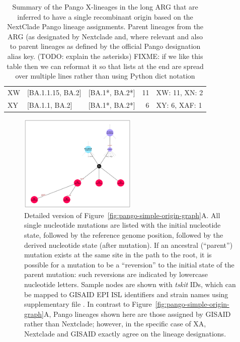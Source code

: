 \documentclass{article}
\begin{document}
\begin{table}
\begin{tabular}{lllrl}
XW      &            [BA.1.1.15, BA.2] &         [BA.1*, BA.2*] &  11 & XW: 11, XN: 2 \\
XY      &               [BA.1.1, BA.2] &         [BA.1*, BA.2*] &   6 & XY: 6, XAF: 1 \\
\bottomrule
\end{tabular}
\caption{\label{tab:pango-single-origin}
Summary of the Pango X-lineages in the long ARG that are inferred to have a single recombinant origin based on the NextClade Pango lineage assignments. Parent lineages from the ARG (as designated by Nextclade and, where relevant and also to parent lineages as defined by the official Pango designation alias key. (TODO: explain the asterisks) FIXME: if we like this table then we can reformat it so that lists at the end are spread over multiple lines rather than using Python dict notation }
\end{table}

\begin{figure} \centering
\includegraphics[width=0.5\textwidth]{figures/Pango_XA_gisaid_large_graph.pdf}
\caption{\label{fig:pango_XA_gisaid_graph}
Detailed version of Figure~\ref{fig:pango-simple-origin-graph}A. All single nucleotide mutations are listed
with the initial nucleotide state, followed by the reference genome position, followed by the derived
nucleotide state (after mutation). If an ancestral (``parent'') mutation exists at the same site in the path
to the root, it is possible for a mutation to be a ``reversion'' to the initial state of the parent mutation:
such reversions are indicated by lowercase nucleotide letters. Sample nodes are shown with \emph{tskit} IDs,
which can be mapped to GISAID EPI ISL identifiers and strain names using supplementary file \protect{}. In contrast to
Figure~\ref{fig:pango-simple-origin-graph}A, Pango lineages shown here are those assigned by GISAID rather
than Nextclade; however, in the specific case of XA, Nextclade and GISAID exactly agree on the lineage designations.
}
\end{figure}
\end{document}
